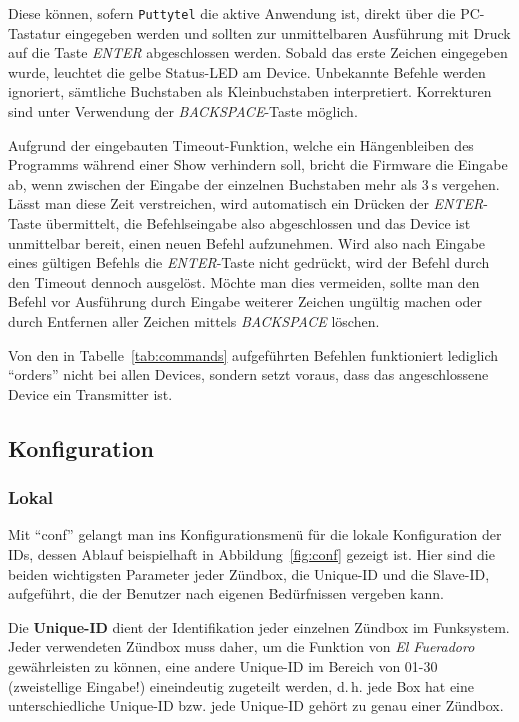 \documentclass[paper=a4, parskip, numbers=noenddot, toc=listof, headsepline]{scrbook}
\newcommand{\anlage}{\emph{El Fueradoro}}
\begin{document}
				Diese können, sofern \texttt{Puttytel} die aktive Anwendung ist, direkt über die PC-Tastatur eingegeben werden und sollten zur unmittelbaren Ausführung mit Druck auf die Taste \emph{ENTER} abgeschlossen werden. Sobald das erste Zeichen eingegeben wurde, leuchtet die gelbe Status-LED am Device. Unbekannte Befehle werden ignoriert, sämtliche Buchstaben als Kleinbuchstaben interpretiert. Korrekturen sind unter Verwendung der \emph{BACKSPACE}-Taste möglich.

				Aufgrund der eingebauten Timeout-Funktion, welche ein Hängenbleiben des Programms während einer Show verhindern soll, bricht die Firmware die Eingabe ab, wenn zwischen der Eingabe der einzelnen Buchstaben mehr als $\SI{3}{\second}$ vergehen. Lässt man diese Zeit verstreichen, wird automatisch ein Drücken der \emph{ENTER}-Taste übermittelt, die Befehlseingabe also abgeschlossen und das Device ist unmittelbar bereit, einen neuen Befehl aufzunehmen. Wird also nach Eingabe eines gültigen Befehls die \emph{ENTER}-Taste nicht gedrückt, wird der Befehl durch den Timeout dennoch ausgelöst. Möchte man dies vermeiden, sollte man den Befehl vor Ausführung durch Eingabe weiterer Zeichen ungültig machen oder durch Entfernen aller Zeichen mittels \emph{BACKSPACE} löschen.

				Von den in Tabelle~\ref{tab:commands} aufgeführten Befehlen funktioniert lediglich \enquote{orders} nicht bei allen Devices, sondern setzt voraus, dass das angeschlossene Device ein Transmitter ist.

			\subsection{Konfiguration}
				\label{sec:config}

				\subsubsection{Lokal}
					\label{subsec:localconf}

					Mit \enquote{conf} gelangt man ins Konfigurationsmenü für die lokale Konfiguration der IDs, dessen Ablauf beispielhaft in Abbildung~\ref{fig:conf} gezeigt ist. Hier sind die beiden wichtigsten Parameter jeder Zündbox, die Unique-ID und die Slave-ID, aufgeführt, die der Benutzer nach eigenen Bedürfnissen vergeben kann.

					Die \textbf{Unique-ID} dient der Identifikation jeder einzelnen Zündbox im Funksystem. Jeder verwendeten Zündbox muss daher, um die Funktion von {\anlage} gewährleisten zu können, eine andere Unique-ID im Bereich von 01-30 (zweistellige Eingabe!) eineindeutig zugeteilt werden, d.\,h. jede Box hat eine unterschiedliche Unique-ID bzw. jede Unique-ID gehört zu genau einer Zündbox.
\end{document}

